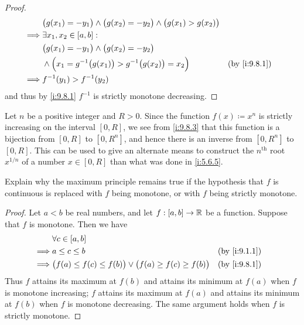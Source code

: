 \begin{proof}
\begin{align*}
             & \big(g(x_1) = -y_1\big) \land \big(g(x_2) = -y_2\big) \land \big(g(x_1) > g(x_2)\big)                     \\
    \implies & \exists x_1, x_2 \in [a, b] :                                                                             \\
             & \big(g(x_1) = -y_1\big) \land \big(g(x_2) = -y_2\big)                                                     \\
             & \land \Big(x_1 = g^{-1}\big(g(x_1)\big) > g^{-1}\big(g(x_2)\big) = x_2\Big)             &  & \by{i:9.8.1} \\
    \implies & f^{-1}(y_1) > f^{-1}(y_2)
  \end{align*}
  and thus by \cref{i:9.8.1} \(f^{-1}\) is strictly monotone decreasing.
\end{proof}

\begin{eg}\label{i:9.8.4}
  Let \(n\) be a positive integer and \(R > 0\).
  Since the function \(f(x) \coloneqq x^n\) is strictly increasing on the interval \([0, R]\), we see from \cref{i:9.8.3} that this function is a bijection from \([0, R]\) to \([0, R^n]\), and hence there is an inverse from \([0, R^n]\) to \([0, R]\).
  This can be used to give an alternate means to construct the \(n^\text{th}\) root \(x^{1 / n}\) of a number \(x \in [0, R]\) than what was done in \cref{i:5.6.5}.
\end{eg}

\exercisesection

\begin{ex}\label{i:ex:9.8.1}
  Explain why the maximum principle remains true if the hypothesis that \(f\) is continuous is replaced with \(f\) being monotone, or with \(f\) being strictly monotone.
\end{ex}

\begin{proof}
  Let \(a < b\) be real numbers, and let \(f : [a, b] \to \mathbb{R}\) be a function.
  Suppose that \(f\) is monotone.
  Then we have
  \begin{align*}
             & \forall c \in [a, b]                                                                         \\
    \implies & a \leq c \leq b                                                            &  & \by{i:9.1.1} \\
    \implies & \big(f(a) \leq f(c) \leq f(b)\big) \lor \big(f(a) \geq f(c) \geq f(b)\big) &  & \by{i:9.8.1} \\
  \end{align*}
  Thus \(f\) attains its maximum at \(f(b)\) and attains its minimum at \(f(a)\) when \(f\) is monotone increasing;
  \(f\) attains its maximum at \(f(a)\) and attains its minimum at \(f(b)\) when \(f\) is monotone decreasing.
  The same argument holds when \(f\) is strictly monotone.
\end{proof}

